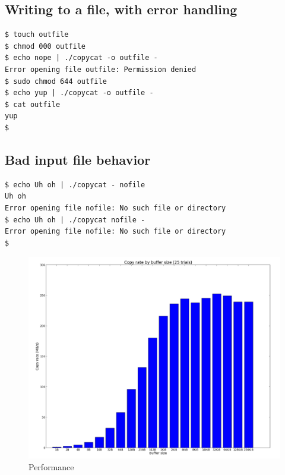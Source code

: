 \documentclass{article}
\begin{document}
\subsection{Writing to a file, with error handling}

\begin{lstlisting}
$ touch outfile
$ chmod 000 outfile
$ echo nope | ./copycat -o outfile -
Error opening file outfile: Permission denied
$ sudo chmod 644 outfile
$ echo yup | ./copycat -o outfile -
$ cat outfile
yup
$
\end{lstlisting}

\subsection{Bad input file behavior}
\begin{lstlisting}
$ echo Uh oh | ./copycat - nofile
Uh oh
Error opening file nofile: No such file or directory
$ echo Uh oh | ./copycat nofile -
Error opening file nofile: No such file or directory
$ 
\end{lstlisting}

\begin{figure}
    \centering
    \includegraphics[width=\linewidth]{../test/results}
    \caption{Performance}
    \label{performancefig}
\end{figure}
\end{document}
